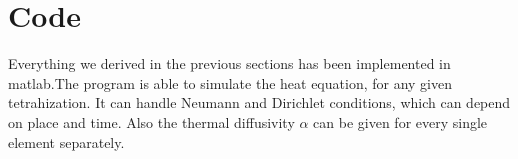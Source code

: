 
\section{\label{sec::code}Code}

Everything we derived in the previous sections has been implemented in matlab.The program is able to simulate the heat equation, for any given tetrahization. It can handle Neumann and Dirichlet conditions, which can depend on place and time. Also the thermal diffusivity $\alpha$ can be given for every single element separately.